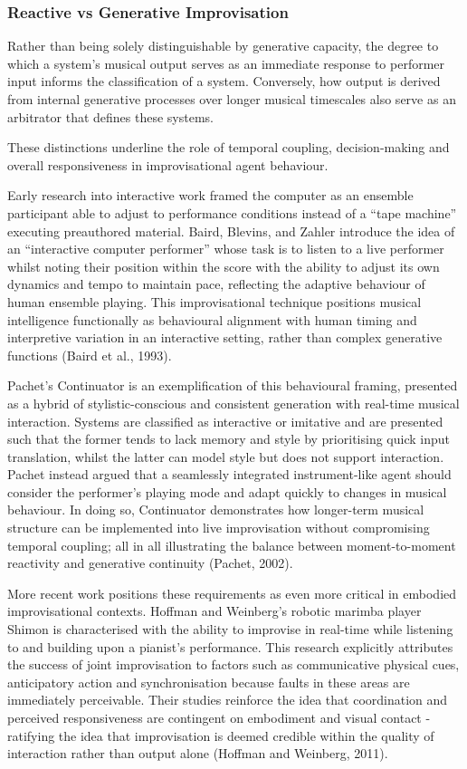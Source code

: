 \documentclass[11pt,a4paper]{article}
\begin{document}
\subsubsection{Reactive vs Generative Improvisation}
Rather than being solely distinguishable by generative capacity, the degree to which a system’s musical output serves as an immediate response to performer input informs the classification of a system. Conversely, how output is derived from internal generative processes over longer musical timescales also serve as an arbitrator that defines these systems.

These distinctions underline the role of temporal coupling, decision-making and overall responsiveness in improvisational agent behaviour.

Early research into interactive work framed the computer as an ensemble participant able to adjust to performance conditions instead of a “tape machine” executing preauthored material. Baird, Blevins, and Zahler introduce the idea of an “interactive computer performer” whose task is to listen to a live performer whilst noting their position within the score with the ability to adjust its own dynamics and tempo to maintain pace, reflecting the adaptive behaviour of human ensemble playing. This improvisational technique positions musical intelligence functionally as behavioural alignment with human timing and interpretive variation in an interactive setting, rather than complex generative functions (Baird et al., 1993).

Pachet’s Continuator is an exemplification of this behavioural framing, presented as a hybrid of stylistic-conscious and consistent generation with real-time musical interaction. Systems are classified as interactive or imitative and are presented such that the former tends to lack memory and style by prioritising quick input translation, whilst the latter can model style but does not support interaction. Pachet instead argued that a seamlessly integrated instrument-like agent should consider the performer’s playing mode and adapt quickly to changes in musical behaviour. In doing so, Continuator demonstrates how longer-term musical structure can be implemented into live improvisation without compromising temporal coupling; all in all illustrating the balance between moment-to-moment reactivity and generative continuity (Pachet, 2002).

More recent work positions these requirements as even more critical in embodied improvisational contexts. Hoffman and Weinberg’s robotic marimba player Shimon is characterised with the ability to improvise in real-time while listening to and building upon a pianist’s performance. This research explicitly attributes the success of joint improvisation to factors such as communicative physical cues, anticipatory action and synchronisation because faults in these areas are immediately perceivable. Their studies reinforce the idea that coordination and perceived responsiveness are contingent on embodiment and visual contact - ratifying the idea that improvisation is deemed credible within the quality of interaction rather than output alone (Hoffman and Weinberg, 2011). 
\end{document}

